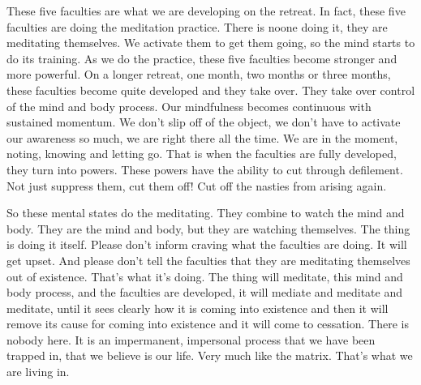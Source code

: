 \documentclass[letterpaper,10pt,english]{sphinxmanual}
\begin{document}
\sphinxAtStartPar
These five faculties are what we are developing on the retreat. In fact,
these five faculties are doing the meditation practice. There is no\sphinxhyphen{}one doing
it, they are meditating themselves. We activate them to get them going, so
the mind starts to do its training. As we do the practice, these five faculties
become  stronger  and  more  powerful.  On  a  longer  retreat,  one  month,  two
months  or  three  months,  these  faculties  become  quite  developed  and  they
take over. They take over control of the mind and body process. Our mindfulness becomes continuous with sustained momentum. We don’t slip off of
the object, we don’t have to activate our awareness so much, we are right
there  all  the  time. We  are  in  the  moment,  noting,  knowing  and  letting  go.
That is when the faculties are fully developed, they turn into powers. These
powers have the ability to cut through defilement. Not just suppress them,
cut them off! Cut off the nasties from arising again.

\sphinxAtStartPar
So these mental states do the meditating. They combine to watch the
mind and body. They are the mind and body, but they are watching themselves. The thing is doing it itself. Please don’t inform craving what the faculties are doing. It will get upset. And please don’t tell the faculties that they
are meditating themselves out of existence. That’s what it’s doing. The thing
will meditate, this mind and body process, and the faculties are developed, it
will mediate and meditate and meditate, until it sees clearly how it is coming
into  existence  and  then  it  will  remove  its  cause  for  coming  into  existence
and it will come to cessation. There is nobody here. It is an impermanent,
impersonal process that we have been trapped in, that we believe is our life.
  Very much like the matrix. That’s what we are living in.
\end{document}

